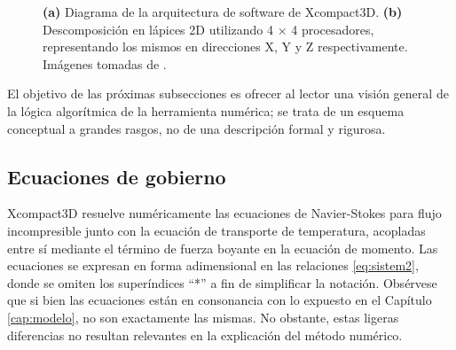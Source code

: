 \begin{figure}[H]
 \centering
    
 \caption{\textbf{(a)} Diagrama de la arquitectura de software de Xcompact3D. \textbf{(b)} Descomposición en lápices 2D utilizando 4 $\times$ 4 procesadores, representando los mismos en direcciones X, Y y Z respectivamente. Imágenes tomadas de \cite{bartholomew2020xcompact3d}.} 
 \label{fig:xc3d}
\end{figure}

El objetivo de las próximas subsecciones es ofrecer al lector una visión general de la lógica algorítmica de la herramienta numérica; se trata de un esquema conceptual a grandes rasgos, no de una descripción formal y rigurosa.

\subsection{Ecuaciones de gobierno}

Xcompact3D resuelve numéricamente las ecuaciones de Navier-Stokes para flujo incompresible junto con la ecuación de transporte de temperatura, acopladas entre sí mediante el término de fuerza boyante en la ecuación de momento. Las ecuaciones se expresan en forma adimensional en las relaciones \ref{eq:sistem2}, donde se omiten los superíndices ``*'' a fin de simplificar la notación. {\linebreak}Obsérvese que si bien las ecuaciones están en consonancia con lo expuesto en el Capítulo \ref{cap:modelo}, no son exactamente las mismas. No obstante, estas ligeras diferencias no resultan relevantes en la explicación del método numérico.

